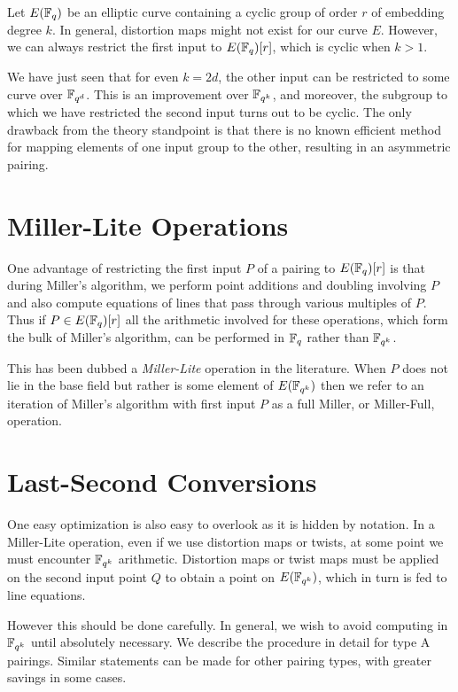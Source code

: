 Let $E(\mathbb{F}_q)$ be an elliptic curve containing a cyclic
group of order $r$ of embedding degree $k$.
In general, distortion maps might not exist for our curve $E$.
However, we can always restrict the first input to $E(\mathbb{F}_q)[r]$,
which is cyclic when $k > 1$.

We have just seen that for even $k = 2d$,
the other input can be restricted to some curve over $\mathbb{F}_{q^d}$.
This is an improvement over $\mathbb{F}_{q^k}$, and moreover, the
subgroup to which we have restricted the second input turns out to be cyclic.
The only drawback from the theory standpoint
is that there is no known efficient method
for mapping elements of one input group to the other, resulting in an
asymmetric pairing.

\section {Miller-Lite Operations}

One advantage of restricting the first input $P$ of a pairing
to $E(\mathbb{F}_q)[r]$ is that during Miller's algorithm, we perform point additions
and doubling involving $P$ and also compute equations of lines that
pass through various multiples of $P$. Thus if $P \in E(\mathbb{F}_q)[r]$ all the
arithmetic involved for these operations, which form the bulk of Miller's
algorithm, can be performed in $\mathbb{F}_q$ rather
than $\mathbb{F}_{q^k}$.

This has been dubbed a \emph{Miller-Lite} operation in the literature.
When $P$ does not lie in the base field but rather is some element of
$E(\mathbb{F}_{q^k})$ then we refer to an iteration of Miller's algorithm with
first input $P$ as a full Miller, or Miller-Full, operation.

\section{Last-Second Conversions}

One easy optimization is also easy to overlook as it is hidden by
notation.
In a Miller-Lite operation, even if we use distortion maps or twists,
at some point we must encounter $\mathbb{F}_{q^k}$ arithmetic.
Distortion maps or twist maps must be applied
on the second input point $Q$ to obtain a point on $E(\mathbb{F}_{q^k})$, which in turn
is fed to line equations.

However this should be done carefully.
In general, we wish to avoid computing in $\mathbb{F}_{q^k}$
until absolutely necessary. We describe the procedure in detail for
type A pairings. Similar statements can be made for other pairing types,
with greater savings in some cases.

